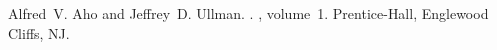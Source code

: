 \begin{thebibliography}{}
	
	Alfred~V. Aho and Jeffrey~D. Ullman.
	.
	, volume~1.
	\newblock Prentice-{Hall}, Englewood Cliffs, NJ.

\end{thebibliography}